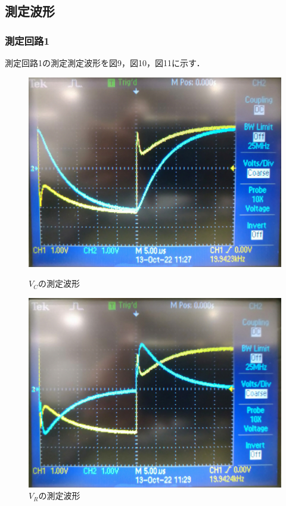 \newpage

\subsection{測定波形}
\subsubsection{測定回路1}
測定回路1の測定測定波形を図9，図10，図11に示す．

\begin{figure}[H]
    \begin{minipage}[b]{0.5\linewidth}
      \centering
      \includegraphics[keepaspectratio, scale=0.3]{DSC_0235.pdf}
      \caption{$V_C$の測定波形}
    \end{minipage}
    \begin{minipage}[b]{0.5\linewidth}
      \centering
      \includegraphics[keepaspectratio, scale=0.3]{DSC_0236.pdf}
      \caption{$V_R$の測定波形}
    \end{minipage}
  \end{figure}

